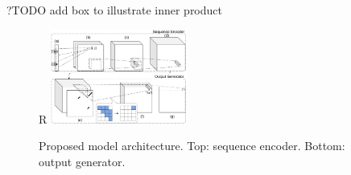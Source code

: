 \documentclass{article}
\begin{document}





%


%
%
%
%


?TODO add box to illustrate inner product

\begin{figure}{R}
        \centering
        \includegraphics[width=0.4\textwidth]{plot/nn_arch_1.pdf}
        \caption{Proposed model architecture. Top: sequence encoder. Bottom: output generator.}
        \label{fig:nn_arch_1}
        \centering
\end{figure}
\end{document}
